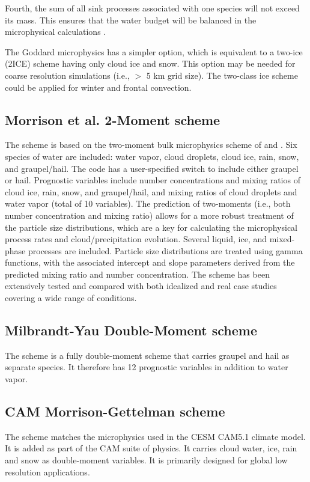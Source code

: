 Fourth, the sum of all sink processes associated with one species will not exceed its mass.  This ensures that the water budget will be balanced in the microphysical calculations .

The Goddard microphysics has a simpler option, which is equivalent to a two-ice (2ICE) scheme having only cloud ice and snow.  This option may be needed for coarse resolution simulations (i.e., $>$ 5 km grid size).  The two-class ice scheme could be applied for winter and frontal convection.

\subsection {Morrison et al. 2-Moment scheme}

The \citet{morrison08} scheme is based on the two-moment bulk
microphysics scheme of \citet{morrison05} and \citet{morrison06}. Six species of
water are included: water vapor, cloud droplets, cloud ice, rain, snow, and
graupel/hail. The code has a user-specified switch to include either graupel or hail. 
Prognostic variables include number concentrations and mixing ratios
of cloud ice, rain, snow, and graupel/hail, and mixing ratios of cloud
droplets and water vapor (total of 10 variables). The prediction of two-moments (i.e., both number concentration and
mixing ratio) allows for a more robust treatment of the particle size
distributions, which are a key for calculating the microphysical process rates
and cloud/precipitation evolution. Several liquid, ice, and mixed-phase
processes are included. Particle size distributions are treated using gamma
functions, with the associated intercept and slope parameters derived from the
predicted mixing ratio and number concentration.
The scheme has been extensively tested and compared with both
idealized and real case studies covering a wide range of conditions.

\subsection {Milbrandt-Yau Double-Moment scheme}
The \citet{milbrandt05} scheme is a fully double-moment scheme that carries graupel and hail as separate species.
It therefore has 12 prognostic variables in addition to water vapor.

\subsection {CAM Morrison-Gettelman scheme}
The \citet{morrisongettelman08} scheme matches the microphysics used in the CESM CAM5.1 climate model. It is added as part of the CAM
suite of physics. It carries cloud water, ice, rain and snow as double-moment variables. It is primarily designed for global low resolution applications.

